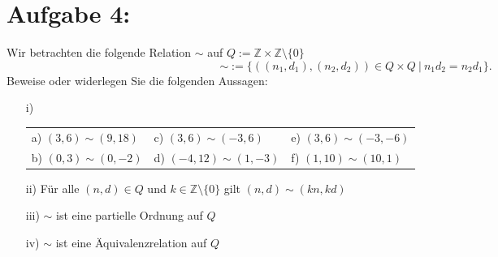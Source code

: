 \documentclass{exam}
\begin{document}
\section*{Aufgabe 4:}
Wir betrachten die folgende Relation $\sim$ auf $Q := \mathbb{Z} \times \mathbb{Z}\setminus\{0\}$ \[
	\sim := \{((n_1,d_1),(n_2,d_2)) \in Q \times Q\ |\ n_1d_2 = n_2d_1\}.
\]
Beweise oder widerlegen Sie die folgenden Aussagen:
\begin{enumerate}
	\item [i)]
	      \renewcommand{\arraystretch}{1.5}
	      \begin{tabularx}{\textwidth}{ X X X }
		      a) $(3,6) \sim (9,18)$ & c) $(3,6) \sim (-3, 6)$   & e) $(3, 6) \sim (-3, -6)$ \\
		      b) $(0,3) \sim (0,-2)$ & d) $(-4,12) \sim (1, -3)$ & f) $(1, 10) \sim (10, 1)$
	      \end{tabularx}
	\item [ii)] Für alle $(n,d) \in Q$ und $k \in \mathbb{Z}\setminus\{0\}$ gilt $(n,d) \sim (kn,kd)$
	\item [iii)] $\sim$ ist eine partielle Ordnung auf $Q$
	\item [iv)] $\sim$ ist eine Äquivalenzrelation auf $Q$
\end{enumerate}
\end{document}
